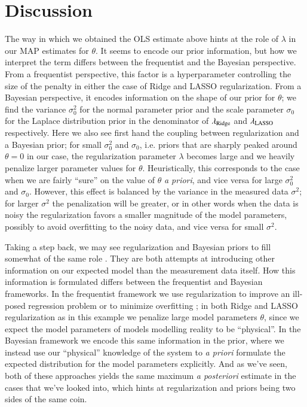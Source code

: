 \documentclass[11pt,a4paper]{article}
\begin{document}
\section{Discussion}

The way in which we obtained the OLS estimate above hints at the role of $\lambda$ in our MAP estimates for $\theta$. It seems to encode our prior information, but how we interpret the term differs between the frequentist and the Bayesian perspective. From a frequentist perspective, this factor is a hyperparameter controlling the size of the penalty in either the case of Ridge and LASSO regularization. From a Bayesian perspective, it encodes information on the shape of our prior for $\theta$; we find the variance $\sigma_0^2$ for the normal parameter prior and the scale parameter $\sigma_0$ for the Laplace distribution prior in the denominator of $\lambda_{\rm Ridge}$ and $\lambda_{\rm LASSO}$ respectively. Here we also see first hand the coupling between regularization and a Bayesian prior; for small $\sigma_0^2$ and $\sigma_0$, i.e. priors that are sharply peaked around $\theta=0$ in our case, the regularization parameter $\lambda$ becomes large and we heavily penalize larger parameter values for $\theta$. Heuristically, this corresponds to the case when we are fairly ``sure'' on the value of $\theta$ \textit{a priori}, and vice versa for large $\sigma_0^2$ and $\sigma_0$. However, this effect is balanced by the variance in the measured data $\sigma^2$; for larger $\sigma^2$ the penalization will be greater, or in other words when the data is noisy the regularization favors a smaller magnitude of the model parameters, possibly to avoid overfitting to the noisy data, and vice versa for small $\sigma^2$.

Taking a step back, we may see regularization and Bayesian priors to fill somewhat of the same role \cite{tds}. They are both attempts at introducing other information on our expected model than the measurement data itself. How this information is formulated differs between the frequentist and Bayesian frameworks. In the frequentist framework we use regularization to improve an ill-posed regression problem or to minimize overfitting \cite{wiki_reg}; in both Ridge and LASSO regularization as in this example we penalize large model parameters $\theta$, since we expect the model parameters of models modelling reality to be ``physical''. In the Bayesian framework we encode this same information in the prior, where we instead use our ``physical'' knowledge of the system to \textit{a priori} formulate the expected distribution for the model parameters explicitly. And as we've seen, both of these approaches yields the same maximum \textit{a posteriori} estimate in the cases that we've looked into, which hints at regularization and priors being two sides of the same coin.

\printbibliography
\end{document}
